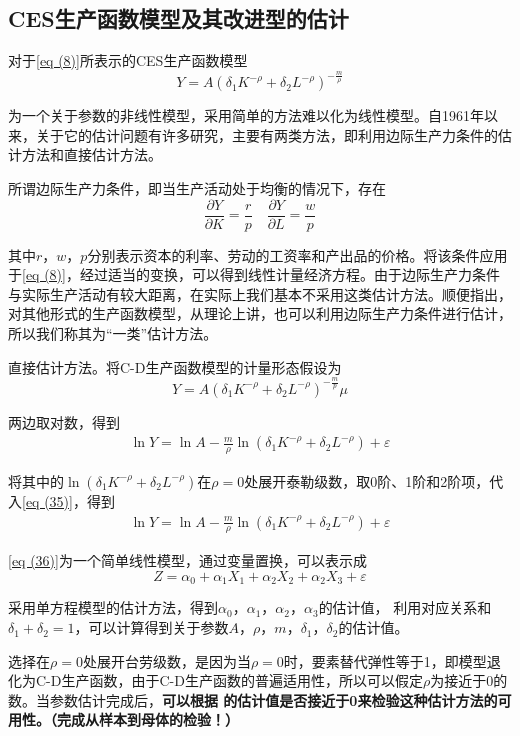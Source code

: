 \subsection{CES生产函数模型及其改进型的估计}
		
	对于\eqref{eq (8)}所表示的CES生产函数模型
	$$ Y=A\left(\delta_{1} K^{-\rho}+\delta_{2} L^{-\rho}\right)^{-\frac{m}{\rho}} $$
		
	为一个关于参数的非线性模型，采用简单的方法难以化为线性模型。自1961年以来，关于它的估计问题有许多研究，主要有两类方法，即利用边际生产力条件的估计方法和直接估计方法。
		
	所谓边际生产力条件，即当生产活动处于均衡的情况下，存在
	$$ \frac{\partial Y}{\partial K}=\frac{r}{p} \quad \frac{\partial Y}{\partial L}=\frac{w}{p} $$
		
	其中$ r $，$ w $，$ p $分别表示资本的利率、劳动的工资率和产出品的价格。将该条件应用于\eqref{eq (8)}，经过适当的变换，可以得到线性计量经济方程。由于边际生产力条件与实际生产活动有较大距离，在实际上我们基本不采用这类估计方法。顺便指出，对其他形式的生产函数模型，从理论上讲，也可以利用边际生产力条件进行估计，所以我们称其为“一类”估计方法。
		
	直接估计方法。将C-D生产函数模型的计量形态假设为
	$$ Y=A\left(\delta_{1} K^{-\rho}+\delta_{2} L^{-\rho}\right)^{-\frac{m}{p}} \mu $$

	两边取对数，得到
	\begin{align}
		\ln Y=\ln A-\frac{m}{\rho} \ln \left(\delta_{1} K^{-\rho}+\delta_{2} L^{-\rho}\right)+\varepsilon \label{eq (35)}
	\end{align}

	将其中的$ \ln \left(\delta_{1} K^{-\rho}+\delta_{2} L^{-\rho}\right) $在$ \rho = 0 $处展开泰勒级数，取0阶、1阶和2阶项，代入\eqref{eq (35)}，得到
	\begin{align}
		\ln Y=\ln A-\frac{m}{\rho} \ln \left(\delta_{1} K^{-\rho}+\delta_{2} L^{-\rho}\right)+\varepsilon \label{eq (36)}
	\end{align}

	\eqref{eq (36)}为一个简单线性模型，通过变量置换，可以表示成
	$$ Z=\alpha_{0}+\alpha_{1} X_{1}+\alpha_{2} X_{2}+\alpha_{2} X_{3}+\varepsilon $$

	采用单方程模型的估计方法，得到$ \alpha_{0} $，$ \alpha_{1} $，$ \alpha_{2} $，$ \alpha_{3} $的估计值，
	利用对应关系和$ \delta _{1}+\delta _{2}=1 $，可以计算得到关于参数$ A $，$ \rho $，$ m $，$ \delta _{1} $，$ \delta _{2} $的估计值。
		
	选择在$ \rho = 0 $处展开台劳级数，是因为当$ \rho = 0 $时，要素替代弹性等于1，即模型退化为C-D生产函数，由于C-D生产函数的普遍适用性，所以可以假定$ \rho $为接近于0的数。当参数估计完成后，\textbf{可以根据 \bm{$ \rho $}的估计值是否接近于0来检验这种估计方法的可用性。（完成从样本到母体的检验！）}
		
